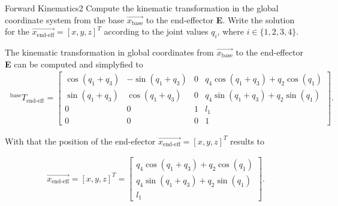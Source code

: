 \begin{questions}


\begin{question}{Forward Kinematics}{2}
Compute the kinematic transformation in the global coordinate system from the base $\vec{x_\textrm{base}}$ to the end-effector \textbf{E}.  
Write the solution for the $\vec{x_\textrm{end-eff}}=[x,y,z]^T$  according to the joint values $q_i$, where $i \in \{1,2,3,4\}$.

\begin{answer}
The kinematic transformation in global coordinates from  $\vec{x_\textrm{base}}$ to the end-effector \textbf{E} can be computed and simplyfied to
\begin{align*}
~^\textrm{base}\!T_{\textrm{end-eff}} &= 
\begin{bmatrix}
\cos(q_{\textrm{1}}+q_{\textrm{3}}) & -\sin(q_{\textrm{1}}+q_{\textrm{3}})& 0 & q_{\textrm{4}}\cos(q_{\textrm{1}}+q_{\textrm{3}}) + q_{\textrm{2}}\cos(q_{\textrm{1}}) \\
\sin(q_{\textrm{1}}+q_{\textrm{3}}) &\cos(q_{\textrm{1}}+q_{\textrm{3}})  & 0 & q_{\textrm{4}}\sin(q_{\textrm{1}}+q_{\textrm{3}}) + q_{\textrm{2}}\sin(q_{\textrm{1}}) \\
0 & 0 & 1 &l_{\textrm{1}} \\
0 & 0 & 0 & 1 
\end{bmatrix}.
\end{align*}

With that the position of the end-efector $\vec{x_\textrm{end-eff}}=[x,y,z]^T$ results to

\begin{align*}
\vec{x_\textrm{end-eff}}=[x,y,z]^T = \begin{bmatrix}
q_{\textrm{4}}\cos(q_{\textrm{1}}+q_{\textrm{3}}) + q_{\textrm{2}}\cos(q_{\textrm{1}}) \\
q_{\textrm{4}}\sin(q_{\textrm{1}}+q_{\textrm{3}}) + q_{\textrm{2}}\sin(q_{\textrm{1}}) \\
l_{\textrm{1}} 
\end{bmatrix}.
\end{align*}


\end{answer}
\end{question}
\end{questions}
